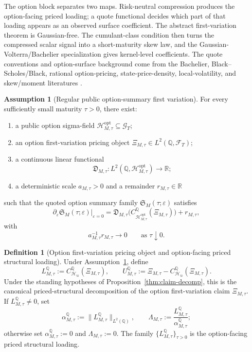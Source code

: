 \documentclass[11pt,a4paper]{amsart}
\theoremstyle{plain}
\theoremstyle{definition}
\newtheorem{definition}[theorem]{Definition}
\newtheorem{assumption}[theorem]{Assumption}
\theoremstyle{remark}
\newcommand{\R}{\mathbb{R}}
\newcommand{\QQ}{\mathbb{Q}}
\newcommand{\cF}{\mathcal{F}}
\newcommand{\cG}{\mathcal{G}}
\newcommand{\cH}{\mathcal{H}}
\begin{document}
The option block separates two maps.  Risk-neutral compression produces the option-facing priced
loading; a quote functional decides which part of that loading appears as an observed surface
coefficient.  The abstract first-variation theorem is Gaussian-free.  The cumulant-class condition
then turns the compressed scalar signal into a short-maturity skew law, and the
Gaussian-Volterra/Bachelier specialization gives kernel-level coefficients.  The quote conventions
and option-surface background come from the Bachelier, Black--Scholes/Black, rational option-pricing,
state-price-density, local-volatility, and skew/moment literatures
\cite{bachelier1900,blackScholes1973,black1976,merton1973,breeden1978,dupire1994,
jarrowRudd1982,corradoSu1996,bakshi2003}.

\begin{assumption}[Regular public option-summary first variation]\label{ass:option-fv}
For every sufficiently small maturity \(\tau>0\), there exist:
\begin{enumerate}[label=(\roman*)]
\item a public option sigma-field \(\cH_{M,\tau}^{\mathrm{opt}}\subseteq \cG_T\);
\item an option first-variation pricing object \(\Xi_{M,\tau}\in L^2(\QQ,\cF_T)\);
\item a continuous linear functional
\[
        \mathfrak D_{M,\tau}\colon L^2(\QQ,\cH_{M,\tau}^{\mathrm{opt}})\to\R;
\]
\item a deterministic scale \(a_{M,\tau}>0\) and a remainder \(r_{M,\tau}\in\R\)
\end{enumerate}
such that the quoted option summary family \(\mathfrak S_M(\tau;\varepsilon)\) satisfies
\[
        \partial_\varepsilon \mathfrak S_M(\tau;\varepsilon)\big|_{\varepsilon=0}
        =
        \mathfrak D_{M,\tau}
        \bigl(C_{\cH_{M,\tau}^{\mathrm{opt}}}^\QQ(\Xi_{M,\tau})\bigr)
        +
        r_{M,\tau},
\]
with
\[
        a_{M,\tau}^{-1}r_{M,\tau}\to0
        \qquad
        \text{as } \tau\downarrow0.
\]
\end{assumption}

\begin{definition}[Option first-variation pricing object and option-facing priced structural loading]\label{def:option-loading}
Under Assumption~\ref{ass:option-fv}, define
\[
        L_{M,\tau}^\QQ:=C_{\cH_\varpi}^\QQ(\Xi_{M,\tau}),
        \qquad
        U_{M,\tau}^\QQ:=\Xi_{M,\tau}-C_{\cH_\varpi}^\QQ(\Xi_{M,\tau}).
\]
Under the standing hypotheses of Proposition~\ref{thm:claim-decomp}, this is the canonical
priced-structural decomposition of the option first-variation claim \(\Xi_{M,\tau}\).
If \(L_{M,\tau}^\QQ\neq0\), set
\[
        \alpha_{M,\tau}^\QQ:=\|L_{M,\tau}^\QQ\|_{L^2(\QQ)},
        \qquad
        \Lambda_{M,\tau}:=\frac{L_{M,\tau}^\QQ}{\alpha_{M,\tau}^\QQ};
\]
otherwise set \(\alpha_{M,\tau}^\QQ:=0\) and \(\Lambda_{M,\tau}:=0\).  The family
\(\{L_{M,\tau}^\QQ\}_{\tau>0}\) is the option-facing priced structural loading.
\end{definition}
\end{document}
